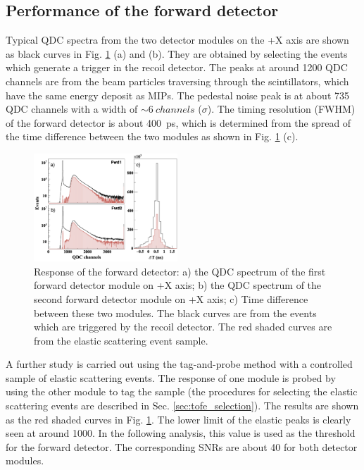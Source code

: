\documentclass[number,5p]{elsarticle}
\begin{document}
\subsection{Performance of the forward detector}
\label{sec:fwd_performance}

Typical QDC spectra from the two detector modules on the +X axis are shown as
black curves in Fig. \ref{fig:fwd_performance} (a) and (b).
They are obtained by selecting the events which generate a trigger in the recoil detector.
The peaks at around \num{1200} QDC channels are from the beam particles traversing through the scintillators, which have the same energy deposit as MIPs.
The pedestal noise peak is at about \num{735} QDC channels with a width of
$\sim\SI{6}{channels}$ ($\sigma$).
The timing resolution (FWHM) of the forward detector is about \SI{400}{ps}, which is determined from the spread of the time difference between the two modules as shown in Fig. \ref{fig:fwd_performance} (c).
\begin{figure}[b!]
  \centering
  \includegraphics[width=0.48\textwidth]{./fwd_performance_elastic.png}
  \caption{Response of the forward detector: a) the QDC spectrum of the first forward detector module on +X axis;
    b) the QDC spectrum of the second forward detector module on +X axis; c) Time difference between these two modules.
    The black curves are from the events which are triggered by the recoil
    detector.
    The red shaded curves are from the elastic scattering event sample.
  }
  \label{fig:fwd_performance}
\end{figure}

A further study is carried out using the tag-and-probe method with a controlled
sample of elastic scattering events.
The response of one module is probed by using the other module to tag the sample
(the procedures for selecting the elastic scattering events are described in Sec. \ref{sec:tofe_selection}).
The results are shown as the red shaded curves in Fig. \ref{fig:fwd_performance}.
The lower limit of the elastic peaks is clearly seen at around \num{1000}.
In the following analysis, this value is used as the threshold for the forward detector.
The corresponding SNRs are about \num{40} for both detector modules.
\end{document}
